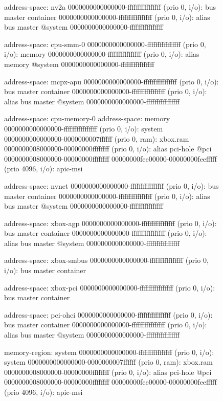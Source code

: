 \begin{figure}
\begin{minipage}{0.48\linewidth}
\begin{ffcode}
    address-space: nv2a
      0000000000000000-ffffffffffffffff (prio 0, i/o): bus master container
        0000000000000000-ffffffffffffffff (prio 0, i/o): alias bus master @system 0000000000000000-ffffffffffffffff

    address-space: cpu-smm-0
      0000000000000000-ffffffffffffffff (prio 0, i/o): memory
        0000000000000000-ffffffffffffffff (prio 0, i/o): alias memory @system 0000000000000000-ffffffffffffffff

    address-space: mcpx-apu
      0000000000000000-ffffffffffffffff (prio 0, i/o): bus master container
        0000000000000000-ffffffffffffffff (prio 0, i/o): alias bus master @system 0000000000000000-ffffffffffffffff

    address-space: cpu-memory-0
    address-space: memory
      0000000000000000-ffffffffffffffff (prio 0, i/o): system
        0000000000000000-0000000007ffffff (prio 0, ram): xbox.ram
        0000000008000000-00000000ffffffff (prio 0, i/o): alias pci-hole @pci 0000000008000000-00000000ffffffff
        00000000fee00000-00000000feefffff (prio 4096, i/o): apic-msi

    address-space: nvnet
      0000000000000000-ffffffffffffffff (prio 0, i/o): bus master container
        0000000000000000-ffffffffffffffff (prio 0, i/o): alias bus master @system 0000000000000000-ffffffffffffffff

    address-space: xbox-agp
      0000000000000000-ffffffffffffffff (prio 0, i/o): bus master container
        0000000000000000-ffffffffffffffff (prio 0, i/o): alias bus master @system 0000000000000000-ffffffffffffffff

    address-space: xbox-smbus
      0000000000000000-ffffffffffffffff (prio 0, i/o): bus master container
    \end{ffcode}
  \end{minipage}
  \begin{minipage}{0.48\linewidth}
    \begin{ffcode}
    address-space: xbox-pci
      0000000000000000-ffffffffffffffff (prio 0, i/o): bus master container

    address-space: pci-ohci
      0000000000000000-ffffffffffffffff (prio 0, i/o): bus master container
        0000000000000000-ffffffffffffffff (prio 0, i/o): alias bus master @system 0000000000000000-ffffffffffffffff

    memory-region: system
      0000000000000000-ffffffffffffffff (prio 0, i/o): system
        0000000000000000-0000000007ffffff (prio 0, ram): xbox.ram
        0000000008000000-00000000ffffffff (prio 0, i/o): alias pci-hole @pci 0000000008000000-00000000ffffffff
        00000000fee00000-00000000feefffff (prio 4096, i/o): apic-msi


\end{ffcode}
\end{minipage}
\end{figure}
